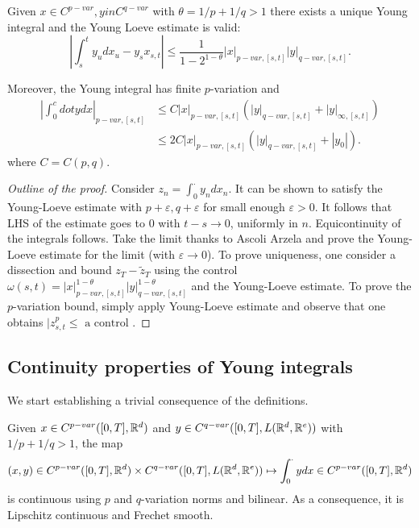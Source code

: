  \begin{theorem}
    Given \(x \in C^{p-var}, y in C^{q-var}\) with \(\theta = 1/p + 1/q > 1\) there exists a unique Young integral and the Young Loeve estimate is valid:
    \begin{equation}
        \left|\int_s^t y_u dx_u - y_s x_{s,t} \right| \le \frac{1}{1 - 2^{1 - \theta}} |x|_{p-var,[s,t]} |y|_{q-var,[s,t]}.
    \end{equation}

    Moreover, the Young integral has finite \(p\)-variation and
    \begin{align}
        \left|\int_0^cdot y dx \right|_{p-var,[s,t]} &\le C |x|_{p-var,[s,t]} (|y|_{q-var,[s,t]} + |y|_{\infty,[s,t]}) \\
        &\le 2C |x|_{p-var,[s,t]} (|y|_{q-var,[s,t]} + |y_0|).
    \end{align}
    where \(C = C(p,q)\).
 \end{theorem}
 \begin{proof}[Outline of the proof]
    Consider \(z_n = \int_0^\cdot y_n dx_n\).
    It can be shown to satisfy the Young-Loeve estimate with \(p+\varepsilon, q+\varepsilon\) for small enough \(\varepsilon>0\).
    It follows that LHS of the estimate goes to \(0\) with \(t - s \rightarrow 0\), uniformly in \(n\).
    Equicontinuity of the integrals follows.
    Take the limit thanks to Ascoli Arzela and prove the Young-Loeve estimate for the limit (with \(\varepsilon \rightarrow 0\)).
    To prove uniqueness, one consider a dissection and bound \(z_T - \tilde{z}_T \) using the control \(\omega(s,t) = |x|^{1-\theta}_{p-var,[s,t]} |y|^{1-\theta}_{q-var,[s,t]}\) and the Young-Loeve estimate.
    To prove the \(p\)-variation bound, simply apply Young-Loeve estimate and observe that one obtains \(|z_{s,t}^p \le \text{ a control }\).
 \end{proof}

 \subsection{Continuity properties of Young integrals}

 We start establishing a trivial consequence of the definitions.

 \begin{proposition}
    Given \(x \in C^{p-var}([0,T], \mathbb{R}^d)\) and \(y \in C^{q-var}([0,T], L(\mathbb{R}^d,\mathbb{R}^e))\) with \(1/p + 1/q > 1\), the map 
    \begin{equation}
        (x,y) \in C^{p-var}([0,T], \mathbb{R}^d) \times C^{q-var}([0,T], L(\mathbb{R}^d,\mathbb{R}^e)) \mapsto \int_0^\cdot y dx \in C^{p-var}([0,T], \mathbb{R}^d)
    \end{equation}
    is continuous using \(p\) and \(q\)-variation norms and bilinear. As a consequence, it is Lipschitz continuous and Frechet smooth.
 \end{proposition}

